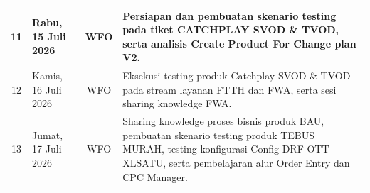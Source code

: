 \documentclass[12pt,a4paper]{article}
\begin{document}
\begin{singlespace}
\begin{tabular}{|c|p{2.6cm}|c|p{9.8cm}|}
\hline
11 & Rabu, 15 Juli 2026 & WFO & Persiapan dan pembuatan skenario testing pada tiket CATCHPLAY SVOD \& TVOD, serta analisis Create Product For Change plan V2. \\
\hline
12 & Kamis, 16 Juli 2026 & WFO & Eksekusi testing produk Catchplay SVOD \& TVOD pada stream layanan FTTH dan FWA, serta sesi sharing knowledge FWA. \\
\hline
13 & Jumat, 17 Juli 2026 & WFO & Sharing knowledge proses bisnis produk BAU, pembuatan skenario testing produk TEBUS MURAH, testing konfigurasi Config DRF OTT XLSATU, serta pembelajaran alur Order Entry dan CPC Manager. \\
\hline
\end{tabular}
\end{singlespace}

\clearpage
\end{document}
